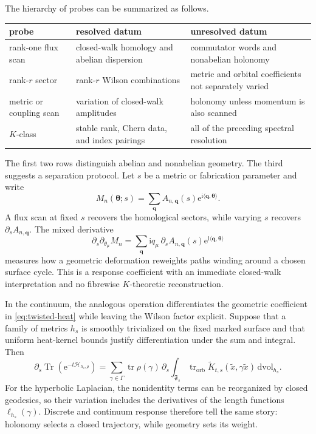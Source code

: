 \documentclass[11pt]{article}
\theoremstyle{definition}
\theoremstyle{remark}
\newcommand{\Tr}{\operatorname{Tr}}
\newcommand{\tr}{\operatorname{tr}}
\newcommand{\cH}{\mathcal H}
\newcommand{\dd}{\mathrm d}
\newcommand{\ii}{\mathrm i}
\newcommand{\e}{\mathrm e}
\begin{document}
The hierarchy of probes can be summarized as follows.
\begin{center}
\small
\begin{tabular}{@{}
  >{\raggedright\arraybackslash}p{}
  >{\raggedright\arraybackslash}p{}
  >{\raggedright\arraybackslash}p{}@{}}
\toprule
\textbf{probe} & \textbf{resolved datum} & \textbf{unresolved datum}\\
\midrule
rank-one flux scan
  & closed-walk homology and abelian dispersion
  & commutator words and nonabelian holonomy\\
rank-\(r\) sector
  & rank-\(r\) Wilson combinations
  & metric and orbital coefficients not separately varied\\
metric or coupling scan
  & variation of closed-walk amplitudes
  & holonomy unless momentum is also scanned\\
\(K\)-class
  & stable rank, Chern data, and index pairings
  & all of the preceding spectral resolution\\
\bottomrule
\end{tabular}
\end{center}

The first two rows distinguish abelian and nonabelian geometry.  The third
suggests a separation protocol.  Let \(s\) be a metric or fabrication
parameter and write
\[
 M_n(\bm\theta;s)
   =\sum_{\bm q}A_{n,\bm q}(s)
      \e^{\ii\langle\bm q,\bm\theta\rangle}.
 \tag{4.29}\label{eq:mixed-response}
\]
A flux scan at fixed \(s\) recovers the homological sectors, while varying
\(s\) recovers \(\partial_s A_{n,\bm q}\).  The mixed derivative
\[
 \partial_s\partial_{\theta_\mu}M_n
   =\sum_{\bm q}\ii q_\mu\,
      \partial_sA_{n,\bm q}(s)
      \e^{\ii\langle\bm q,\bm\theta\rangle}
 \tag{4.30}\label{eq:mixed-response-derivative}
\]
measures how a geometric deformation reweights paths winding around a chosen
surface cycle.  This is a response coefficient with an immediate closed-walk
interpretation and no fibrewise \(K\)-theoretic reconstruction.

In the continuum, the analogous operation differentiates the geometric
coefficient in \eqref{eq:twisted-heat} while leaving the Wilson factor
explicit.  Suppose that a family of metrics \(h_s\) is smoothly trivialized
on the fixed marked surface and that uniform heat-kernel bounds justify
differentiation under the sum and integral.  Then
\[
 \partial_s\Tr\!\left(\e^{-t\cH_{h_s,\rho}}\right)
   =\sum_{\gamma\in\Gamma}
      \tr\rho(\gamma)\,
      \partial_s
      \int_{\mathfrak F_s}
       \tr_{\mathrm{orb}}
       \widetilde K_{t,s}(\widetilde x,\gamma\widetilde x)
       \,\dd\mathrm{vol}_{h_s}.
 \tag{4.31}\label{eq:mixed-heat-response}
\]
For the hyperbolic Laplacian, the nonidentity terms can be reorganized by
closed geodesics, so their variation includes the derivatives of the length
functions \(\ell_{h_s}(\gamma)\).  Discrete and continuum response therefore
tell the same story: holonomy selects a closed trajectory, while geometry
sets its weight.
\end{document}

